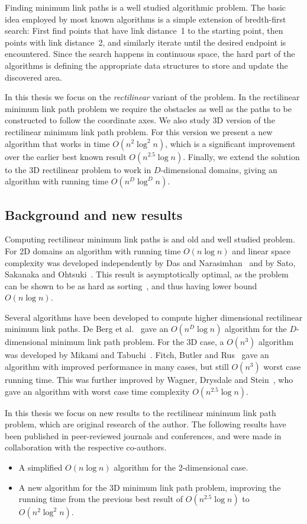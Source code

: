 \documentclass[english,gradu]{tktltiki2018}
\begin{document}
Finding minimum link paths is a well studied algorithmic problem.
The basic idea employed by most known algorithms is a simple extension of bredth-first search:
First find points that have link distance~1 to the starting point, then points with link distance~2, and similarly iterate until the desired endpoint is encountered.
Since the search happens in continuous space, the hard part of the algorithms is defining the appropriate data structures to store and update the discovered area.

In this thesis we focus on the \emph{rectilinear} variant of the problem.
In the rectilinear minimum link path problem we require the obstacles as well as the paths to be constructed to follow the coordinate axes.
We also study 3D version of the rectilinear minimum link path problem.
For this version we present a new algorithm that works in time $O(n^2\log^2n)$, which is a significant improvement over the earlier best known result $O(n^{2.5}\log n)$.\cite{restricted}
Finally, we extend the solution to the 3D rectilinear problem to work in $D$-dimensional domains, giving an algorithm with running time $O(n^D\log^Dn)$.

\subsection{Background and new results}

Computing rectilinear minimum link paths is and old and well studied problem.
For 2D domains an algorithm with running time $O(n\log n)$ and linear space complexity was developed independently by Das and Narasimhan~\cite{dasnar} and by Sato, Sakanaka and Ohtsuki~\cite{sato}.
This result is asymptotically optimal, as the problem can be shown to be as hard as sorting~\cite{dasnar}, and thus having lower bound $O(n\log n)$.

Several algorithms have been developed to compute higher dimensional rectilinear minimum link paths.
De Berg et al.~\cite{de1992} gave an $O(n^D\log n)$ algorithm for the $D$-dimensional minimum link path problem.
For the 3D case, a $O(n^3)$ algorithm was developed by Mikami and Tabuchi~\cite{mikami}.
Fitch, Butler and Rus~\cite{fitch} gave an algorithm with improved performance in many cases, but still $O(n^3)$ worst case running time.
This was further improved by Wagner, Drysdale and Stein~\cite{wagner}, who gave an algorithm with worst case time complexity $O(n^{2.5}\log n)$.

In this thesis we focus on new results to the rectilinear minimum link path problem, which are original research of the author.
The following results have been published in peer-reviewed journals and conferences, and were made in collaboration with the respective co-authors.
\begin{itemize}
\item A simplified $O(n\log n)$ algorithm for the 2-dimensional case.
\item A new algorithm for the 3D minimum link path problem, improving the running time from the previous best result of $O(n^{2.5}\log n)$ to $O(n^2\log^2 n)$.
\end{itemize}
\end{document}
